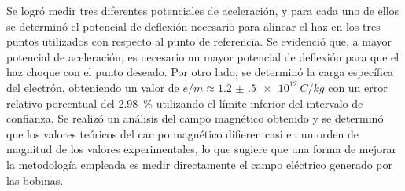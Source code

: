 Se logró medir tres diferentes potenciales de aceleración, y para cada uno de ellos se determinó el potencial de deflexión necesario 
para alinear el haz en los tres puntos utilizados con respecto al punto de referencia. Se evidenció que, a mayor potencial de aceleración,
es necesario un mayor potencial de deflexión para que el haz choque con el punto deseado. Por otro lado, se determinó la carga específica del 
electrón, obteniendo un valor de \(e / m \approx \qty{1.2(5)e+12}{C \per kg}\) con un error relativo porcentual del \qty{2.98}{\percent} 
utilizando el límite inferior del intervalo de confianza. Se realizó un análisis del campo magnético obtenido y se determinó que los valores 
teóricos del campo magnético difieren casi en un orden de magnitud de los valores experimentales, lo que sugiere que una forma de mejorar la 
metodología empleada es medir directamente el campo eléctrico generado por las bobinas.

